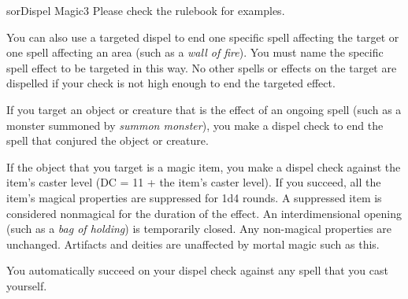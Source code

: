 \begin{spellcard}{sor}{Dispel Magic}{3}
  Please check the rulebook for examples.

  You can also use a targeted dispel to end one specific spell affecting the target or one spell affecting an area
  (such as a \emph{wall of fire}).
  You must name the specific spell effect to be targeted in this way.
  No other spells or effects on the target are dispelled if your check is not high enough to end the targeted effect.

  If you target an object or creature that is the effect of an ongoing spell
  (such as a monster summoned by \emph{summon monster}),
  you make a dispel check to end the spell that conjured the object or creature.

  If the object that you target is a magic item,
  you make a dispel check against the item's caster level (DC = 11 + the item's caster level).
  If you succeed, all the item's magical properties are suppressed for 1d4 rounds.
  A suppressed item is considered nonmagical for the duration of the effect.
  An interdimensional opening (such as a \emph{bag of holding}) is temporarily closed.
  Any non-magical properties are unchanged.
  Artifacts and deities are unaffected by mortal magic such as this.

  You automatically succeed on your dispel check against any spell that you cast yourself.

\end{spellcard}
